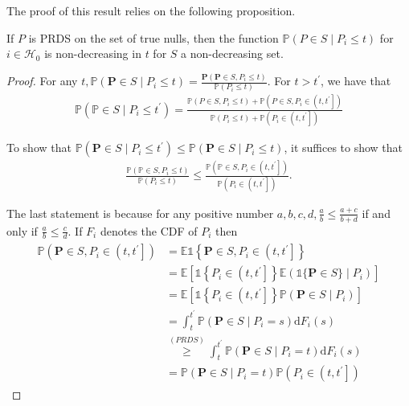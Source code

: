 The proof of this result relies on the following proposition.
\begin{prop}
    If $P$ is PRDS on the set of true nulls, then the function $\mathbb{P}\left(P \in S \mid P_i \leq t\right)$ for $i \in \mathcal{H}_0$ is non-decreasing in $t$ for $S$ a non-decreasing set.
\end{prop}

\begin{proof}
    For any $t, \mathbb{P}\left(\boldsymbol{P} \in S \mid P_i \leq t\right)=\frac{\mathbf{P}\left(\boldsymbol{P} \in S, P_i \leq t\right)}{\mathbb{P}\left(P_i \leq t\right)}$. For $t>t^{\prime}$, we have that
\begin{align*}
\mathbb{P}\left(\mathbb{P} \in S \mid P_i \leq t^{\prime}\right)=\frac{\mathbb{P}\left(P \in S, P_i \leq t\right)+\mathbb{P}\left(P \in S, P_i \in\left(t, t^{\prime}\right]\right)}{\mathbb{P}\left(P_i \leq t\right)+\mathbb{P}\left(P_i \in\left(t, t^{\prime}\right]\right)}
\end{align*}


To show that $\mathbb{P}\left(\boldsymbol{P} \in S \mid P_i \leq t^{\prime}\right) \leq \mathbb{P}\left(\boldsymbol{P} \in S \mid P_i \leq t\right)$, it suffices to show that
\begin{align*}
\frac{\mathbb{P}\left(\mathbb{P} \in S, P_i \leq t\right)}{\mathbb{P}\left(P_i \leq t\right)} \leq \frac{\mathbb{P}\left(\mathbb{P} \in S, P_i \in\left(t, t^{\prime}\right]\right)}{\mathbb{P}\left(P_i \in\left(t, t^{\prime}\right]\right)} .
\end{align*}


The last statement is because for any positive number $a, b, c, d, \frac{a}{b} \leq \frac{a+c}{b+d}$ if and only if $\frac{a}{b} \leq \frac{c}{d}$. If $F_i$ denotes the CDF of $P_i$ then
\begin{align*}
\begin{aligned}
\mathbb{P}\left(\boldsymbol{P} \in S, P_i \in\left(t, t^{\prime}\right]\right) & =\mathbb{E} \mathbb{1}\left\{\boldsymbol{P} \in S, P_i \in\left(t, t^{\prime}\right]\right\} \\
& =\mathbb{E}\left[\mathbb{1}\left\{P_i \in\left(t, t^{\prime}\right]\right\} \mathbb{E}\left(\mathbb{1}\{\boldsymbol{P} \in S\} \mid P_i\right)\right] \\
& =\mathbb{E}\left[\mathbb{1}\left\{P_i \in\left(t, t^{\prime}\right]\right\} \mathbb{P}\left(\boldsymbol{P} \in S \mid P_i\right)\right] \\
& =\int_t^{t^{\prime}} \mathbb{P}\left(\boldsymbol{P} \in S \mid P_i=s\right) \mathrm{d} F_i(s) \\
& \stackrel{(P R D S)}{\geq} \int_t^{t^{\prime}} \mathbb{P}\left(\boldsymbol{P} \in S \mid P_i=t\right) \mathrm{d} F_i(s) \\
& =\mathbb{P}\left(\boldsymbol{P} \in S \mid P_i=t\right) \mathbb{P}\left(P_i \in\left(t, t^{\prime}\right]\right)
\end{aligned}
\end{align*}



\end{proof}
